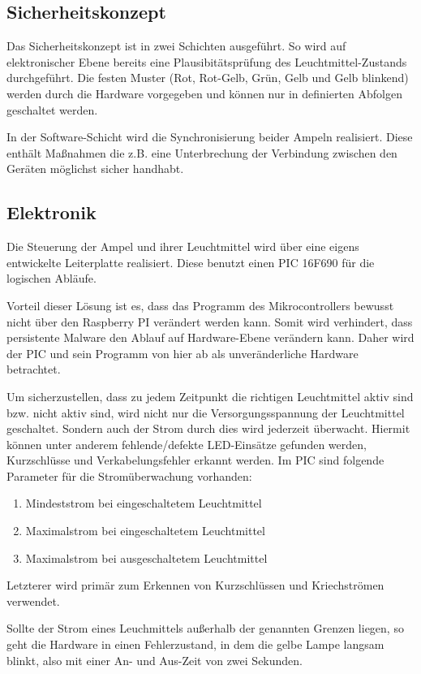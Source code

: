\documentclass[a4paper, ngerman]{scrartcl}
\begin{document}
\subsection{Sicherheitskonzept}
Das Sicherheitskonzept ist in zwei Schichten ausgeführt. So wird auf elektronischer Ebene bereits eine Plausibitätsprüfung des Leuchtmittel-Zustands durchgeführt. Die festen Muster (Rot, Rot-Gelb, Grün, Gelb und Gelb blinkend) werden durch die Hardware vorgegeben und können nur in definierten Abfolgen geschaltet werden.

In der Software-Schicht wird die Synchronisierung beider Ampeln realisiert. Diese enthält Maßnahmen die z.B. eine Unterbrechung der Verbindung zwischen den Geräten möglichst sicher handhabt.
\subsection{Elektronik}
Die Steuerung der Ampel und ihrer Leuchtmittel wird über eine eigens entwickelte Leiterplatte realisiert. Diese benutzt einen PIC 16F690 für die logischen Abläufe.

Vorteil dieser Lösung ist es, dass das Programm des Mikrocontrollers bewusst nicht über den Raspberry PI verändert werden kann. Somit wird verhindert, dass persistente Malware den Ablauf auf Hardware-Ebene verändern kann. Daher wird der PIC und sein Programm von hier ab als unveränderliche Hardware betrachtet.

Um sicherzustellen, dass zu jedem Zeitpunkt die richtigen Leuchtmittel aktiv sind bzw. nicht aktiv sind, wird nicht nur die Versorgungsspannung der Leuchtmittel geschaltet. Sondern auch der Strom durch dies wird jederzeit überwacht. Hiermit können unter anderem fehlende/defekte LED-Einsätze gefunden werden, Kurzschlüsse und Verkabelungsfehler erkannt werden. Im PIC sind folgende Parameter für die Stromüberwachung vorhanden:
\begin{enumerate}
	\item Mindeststrom bei eingeschaltetem Leuchtmittel
	\item Maximalstrom bei eingeschaltetem Leuchtmittel
	\item Maximalstrom bei ausgeschaltetem Leuchtmittel
\end{enumerate}
Letzterer wird primär zum Erkennen von Kurzschlüssen und Kriechströmen verwendet.

Sollte der Strom eines Leuchmittels außerhalb der genannten Grenzen liegen, so geht die Hardware in einen Fehlerzustand, in dem die gelbe Lampe langsam blinkt, also mit einer An- und Aus-Zeit von zwei Sekunden.
\end{document}
